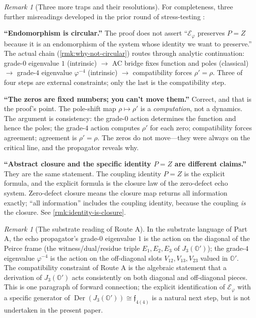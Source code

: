 \documentclass[11pt,a4paper]{article}
\theoremstyle{plain}
\theoremstyle{definition}
\theoremstyle{remark}
\newtheorem{remark}[theorem]{Remark}
\numberwithin{equation}{section}
\providecommand{\Os}{\mathbb{O}'}
\providecommand{\vp}{\varphi}
\providecommand{\EF}{\mathcal{E}}
\providecommand{\fk}[1]{\mathfrak{#1}}
\DeclareMathOperator{\Der}{Der}
\begin{document}
\begin{remark}[Three more traps and their resolutions]
\label{rmk:three-more-traps}
For completeness, three further misreadings developed in the
prior round of stress-testing \cite{echo-rh}:

\smallskip\textbf{``Endomorphism is circular.''}\quad
The proof does not assert ``$\EF_\vp$ preserves $P = Z$ because it
is an endomorphism of the system whose identity we want to
preserve.''  The actual chain (\cref{rmk:why-not-circular}) routes
through analytic continuation: grade-$0$ eigenvalue $1$
(intrinsic) $\to$ AC bridge fixes function and poles (classical)
$\to$ grade-$4$ eigenvalue $\vp^{-4}$ (intrinsic) $\to$
compatibility forces $\rho' = \rho$.  Three of four steps are
external constraints; only the last is the compatibility step.

\smallskip\textbf{``The zeros are fixed numbers; you can't move
them.''}\quad
Correct, and that is the proof's point.  The pole-shift map
$\rho \mapsto \rho'$ is a \emph{computation}, not a dynamics.
The argument is consistency: the grade-$0$ action determines the
function and hence the poles; the grade-$4$ action computes
$\rho'$ for each zero; compatibility forces agreement; agreement
is $\rho' = \rho$.  The zeros do not move---they were always on
the critical line, and the propagator reveals why.

\smallskip\textbf{``Abstract closure and the specific identity
$P = Z$ are different claims.''}\quad
They are the same statement.  The coupling identity $P = Z$ is
the explicit formula, and the explicit formula is the closure
law of the zero-defect echo system.  Zero-defect closure means
the closure map returns all information exactly; ``all
information'' includes the coupling identity, because the
coupling \emph{is} the closure.  See \cref{rmk:identity-is-closure}.
\end{remark}

\begin{remark}[The substrate reading of Route A]
\label{rmk:substrate-reading-of-route-a}
In the substrate language of Part A, the echo propagator's
grade-$0$ eigenvalue $1$ is the action on the diagonal of the
Peirce frame (the witness/dual/residue triple $E_1, E_2, E_3$ of
$J_3(\Os)$); the grade-$4$ eigenvalue $\vp^{-4}$ is the action on
the off-diagonal slots $V_{12}, V_{13}, V_{23}$ valued in $\Os$.
The compatibility constraint of Route A is the algebraic
statement that a derivation of $J_3(\Os)$ acts consistently on
both diagonal and off-diagonal pieces.  This is one paragraph of
forward connection; the explicit identification of $\EF_\vp$ with a
specific generator of $\Der(J_3(\Os)) \cong \fk{f}_{4(4)}$ is a
natural next step, but is not undertaken in the present paper.
\end{remark}
\end{document}
